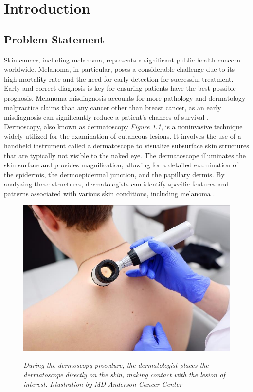 \chapter{Introduction}
\label{cap:intro}

\section{Problem Statement}

Skin cancer, including melanoma, represents a significant public health concern worldwide. Melanoma, in particular, poses a considerable challenge due to its high mortality rate and the need for early detection for successful treatment. Early and correct diagnosis is key for ensuring patients have the best possible prognosis.
Melanoma misdiagnosis accounts for more pathology and dermatology malpractice claims than any
cancer other than breast cancer, as an early misdiagnosis can significantly reduce a patient’s chances of
survival \cite{Melanoma}. \\

Dermoscopy, also known as dermatoscopy \textit{Figure \ref{fig:procedure_dermoscopy}}, is a noninvasive technique widely utilized for the examination of cutaneous lesions. It involves the use of a handheld instrument called a dermatoscope to visualize subsurface skin structures that are typically not visible to the naked eye. The dermatoscope illuminates the skin surface and provides magnification, allowing for a detailed examination of the epidermis, the dermoepidermal junction, and the papillary dermis. By analyzing these structures, dermatologists can identify specific features and patterns associated with various skin conditions, including melanoma \cite{Dermoscopy}. 

\begin{figure}[htb]
\centering
\includegraphics[width=6.5 cm]{imatges/introduction/medical_procedure_dermastocopy.jpeg}
\caption[Dermoscopy Procedure]{\textit{During the dermoscopy procedure, the dermatologist places the dermatoscope directly on the skin, making contact with the lesion of interest. Illustration by MD Anderson Cancer Center}}
{\label{fig:procedure_dermoscopy}}
\end{figure}

